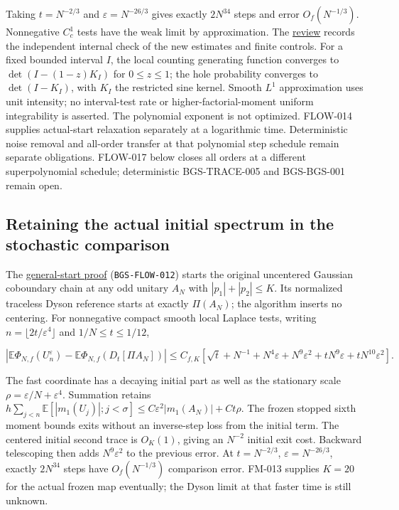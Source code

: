 Taking \(t=N^{-2/3}\) and \(\varepsilon=N^{-26/3}\) gives exactly
\(2N^{34}\) steps and error \(O_f(N^{-1/3})\). Nonnegative \(C_c^1\) tests
have the weak limit by approximation. The
\href{https://github.com/ChurilovMaksim/BGS/blob/main/archive/record/polynomial_coboundary_review_20261004.md}{review} records the
independent internal check of the new estimates and finite controls.
For a fixed bounded interval \(I\), the local counting generating function
converges to \(\det(I-(1-z)K_I)\) for \(0\le z\le1\); the hole probability
converges to \(\det(I-K_I)\), with \(K_I\) the restricted sine kernel.
Smooth \(L^1\) approximation uses unit intensity; no interval-test rate
or higher-factorial-moment uniform integrability is asserted.
The polynomial exponent is not optimized. FLOW-014 supplies actual-start
relaxation separately at a logarithmic time. Deterministic noise removal
and all-order transfer at that polynomial step schedule remain separate
obligations. FLOW-017 below closes all orders at a different superpolynomial
schedule; deterministic BGS-TRACE-005 and BGS-BGS-001 remain open.

\hypertarget{retaining-the-actual-initial-spectrum-in-the-stochastic-comparison}{%
\subsection{Retaining the actual initial spectrum in the stochastic comparison}\label{retaining-the-actual-initial-spectrum-in-the-stochastic-comparison}}

The \href{https://github.com/ChurilovMaksim/BGS/blob/main/mathematics/coboundary_general_start.md}{general-start proof} (\texttt{BGS-FLOW-012})
starts the original uncentered Gaussian coboundary chain at any odd
unitary \(A_N\) with \(|p_1|+|p_2|\le K\). Its normalized traceless Dyson
reference starts at exactly \(\Pi(A_N)\); the algorithm inserts no centering.
For nonnegative compact smooth local Laplace tests, writing
\(n=\lfloor2t/\varepsilon^4\rfloor\) and \(1/N\le t\le1/12\),

\[
\left|\mathbb E\Phi_{N,f}(U_n^\varepsilon)
-\mathbb E\Phi_{N,f}(D_t[\Pi A_N])\right|
\le C_{f,K}[\sqrt t+N^{-1}+N^4\varepsilon+N^9\varepsilon^2
+tN^9\varepsilon+tN^{10}\varepsilon^2].
\]

The fast coordinate has a decaying initial part as well as the stationary
scale \(\rho=\varepsilon/N+\varepsilon^4\). Summation retains
\(h\sum_{j<n}\mathbb E[|m_1(U_j)|;j<\sigma] \le C\varepsilon^2|m_1(A_N)|+Ct\rho\).
The frozen stopped sixth moment bounds exits without an inverse-step
loss from the initial term. The centered initial second trace is \(O_K(1)\),
giving an \(N^{-2}\) initial exit cost. Backward telescoping then adds
\(N^9\varepsilon^2\) to the previous error.
At \(t=N^{-2/3}\), \(\varepsilon=N^{-26/3}\), exactly \(2N^{34}\) steps have
\(O_f(N^{-1/3})\) comparison error. FM-013 supplies \(K=20\) for the actual
frozen map eventually; the Dyson limit at that faster time is still unknown.

